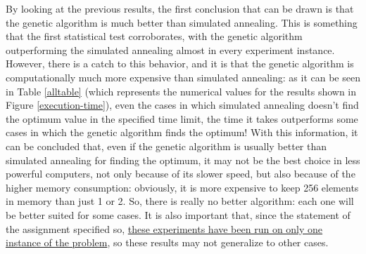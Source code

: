 \documentclass{article}[12pt]
\begin{document}
	By looking at the previous results, the first conclusion that can be drawn is that the genetic algorithm is much better than simulated annealing. This is something that the first statistical test corroborates, with the genetic algorithm outperforming the simulated annealing almost in every experiment instance.
	\bigbreak
	However, there is a catch to this behavior, and	it is that the genetic algorithm is computationally much more expensive than simulated annealing: as it can be seen in Table \ref{alltable} (which represents the numerical values for the results shown in Figure \ref{execution-time}), even the cases in which simulated annealing doesn't find the optimum value in the specified time limit, the time it takes outperforms some cases in which the genetic algorithm finds the optimum!
	\bigbreak
	With this information, it can be concluded that, even if the genetic algorithm is usually better than simulated annealing for finding the optimum, it may not be the best choice in less powerful computers, not only because of its slower speed, but also because of the higher memory consumption: obviously, it is more expensive to keep 256 elements in memory than just 1 or 2. So, there is really no better algorithm: each one will be better suited for some cases. It is also important that, since the statement of the assignment specified so, \underline{these experiments have been run on only one instance of the problem}, so these results may not generalize to other cases.
\end{document}
